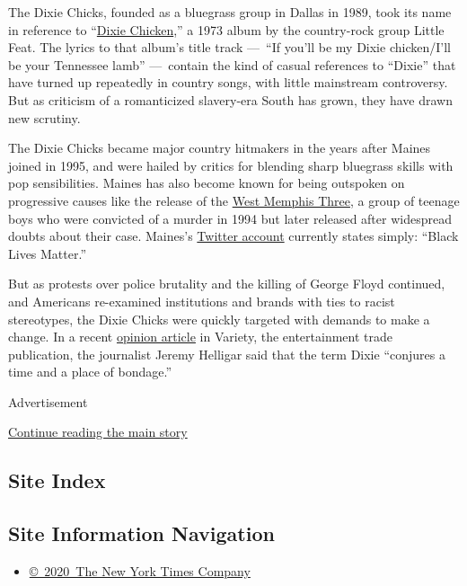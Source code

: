 The Dixie Chicks, founded as a bluegrass group in Dallas in 1989, took
its name in reference to
``\href{https://www.youtube.com/watch?v=yaHEfJApEVM}{Dixie Chicken},'' a
1973 album by the country-rock group Little Feat. The lyrics to that
album's title track ---~``If you'll be my Dixie chicken/I'll be your
Tennessee lamb'' ---~contain the kind of casual references to ``Dixie''
that have turned up repeatedly in country songs, with little mainstream
controversy. But as criticism of a romanticized slavery-era South has
grown, they have drawn new scrutiny.

The Dixie Chicks became major country hitmakers in the years after
Maines joined in 1995, and were hailed by critics for blending sharp
bluegrass skills with pop sensibilities. Maines has also become known
for being outspoken on progressive causes like the release of the
\href{https://www.nytimes3xbfgragh.onion/2011/08/20/us/20arkansas.html}{West
Memphis Three}, a group of teenage boys who were convicted of a murder
in 1994 but later released after widespread doubts about their case.
Maines's \href{https://twitter.com/1NatalieMaines}{Twitter account}
currently states simply: ``Black Lives Matter.''

But as protests over police brutality and the killing of George Floyd
continued, and Americans re-examined institutions and brands with ties
to racist stereotypes, the Dixie Chicks were quickly targeted with
demands to make a change. In a recent
\href{https://variety.com/2020/music/opinion/dixie-chicks-name-rethink-lady-antebellum-1234636972/}{opinion
article} in Variety, the entertainment trade publication, the journalist
Jeremy Helligar said that the term Dixie ``conjures a time and a place
of bondage.''

Advertisement

\protect\hyperlink{after-bottom}{Continue reading the main story}

\hypertarget{site-index}{%
\subsection{Site Index}\label{site-index}}

\hypertarget{site-information-navigation}{%
\subsection{Site Information
Navigation}\label{site-information-navigation}}

\begin{itemize}
\tightlist
\item
  \href{https://help.nytimes3xbfgragh.onion/hc/en-us/articles/115014792127-Copyright-notice}{©~2020~The
  New York Times Company}
\end{itemize}

